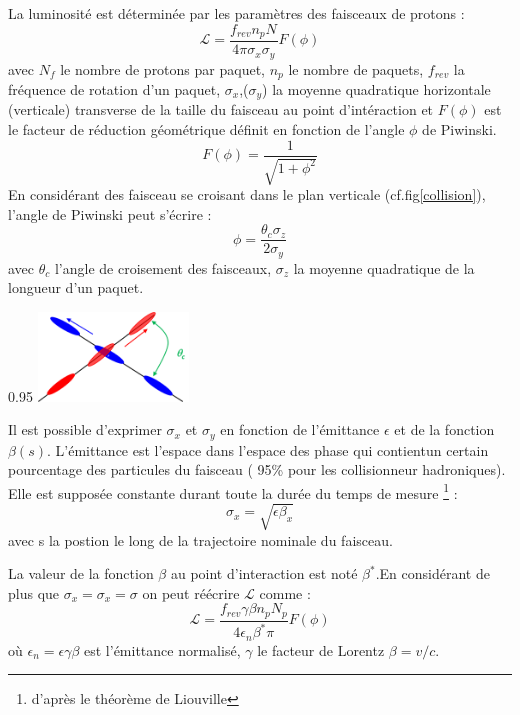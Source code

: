 La luminosité est déterminée par les paramètres des faisceaux de protons :
\begin{equation}
\mathcal{L}=\frac{f_{rev}n_{p}N_{}}{4\pi \sigma_{x} \sigma_{y}} F(\phi)
\end{equation}
avec $N_{f}$ le nombre de protons par paquet, $n_{p}$ le nombre de paquets, $f_{rev}$ la fréquence de rotation d'un paquet, $\sigma_{x}$,($\sigma_{y}$) la moyenne quadratique horizontale (verticale) transverse de la taille du faisceau au point d'intéraction et $F(\phi)$ est le facteur de réduction géométrique définit en fonction de l'angle $\phi$ de Piwinski.
\begin{equation}
F(\phi)=\frac{1}{\sqrt{1+\phi^{2}}}
\end{equation}
En considérant des faisceau se croisant dans le plan verticale (cf.fig\ref{collision}), l'angle de Piwinski peut s'écrire :
\begin{equation}
\phi=\frac{\theta_{c}\sigma_{z}}{2\sigma_{y}}
\end{equation}
avec $\theta_{c}$ l'angle de croisement des faisceaux, $\sigma_{z}$ la moyenne quadratique de la longueur d'un paquet.


\begin{minipagewithmarginpars}[h]{0.95\textwidth}
\centering
\includegraphics[width=0.3\textwidth]{LHC/collision.png}
\label{collision}	
\end{minipagewithmarginpars}

Il est possible d'exprimer $\sigma_{x}$ et $\sigma_{y}$ en fonction de l'émittance $\epsilon$ et de la fonction $\beta(s)$. L'émittance est l'espace dans l'espace des phase qui contientun certain pourcentage des particules du faisceau ( 95\% pour les collisionneur hadroniques). Elle est supposée constante durant toute la durée du temps de mesure \footnote{d'après le théorème de Liouville} :
\begin{equation}
\sigma_{x}=\sqrt{\epsilon\beta_{x}}
\end{equation}
avec s la postion le long de la trajectoire nominale du faisceau.

La valeur de la fonction $\beta$ au point d'interaction est noté $\beta^{*}$.En considérant de plus que $\sigma_{x}=\sigma_{x}=\sigma$ on peut réécrire $\mathcal{L}$ comme :
\begin{equation}
\mathcal{L}=\frac{f_{rev}\gamma\beta n_{p}N_{p}}{4\epsilon_{n}\beta^{*}\pi} F(\phi)
\end{equation}
où $\epsilon_{n}=\epsilon\gamma\beta$ est l'émittance normalisé, $\gamma$ le facteur de Lorentz $\beta=v/c$.

